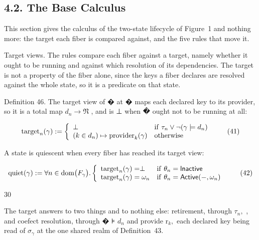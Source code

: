 \documentclass[
  10
]{article}
\begin{document}
\subsection{4.2. The Base Calculus}\label{the-base-calculus}

This section gives the calculus of the two-state lifecycle of Figure~1
and nothing more: the target each fiber is compared against, and the
five rules that move it.

Target views. The rules compare each fiber against a target, namely
whether it ought to be running and against which resolution of its
dependencies. The target is not a property of the fiber alone, since the
keys a fiber declares are resolved against the whole state, so it is a
predicate on that state.

Definition 46. The target view of � at � maps each declared key to its
provider, so it is a total map \(d _ { n } \to \mathfrak { N }\) , and
is ⊥ when � ought not to be running at all:

\[
\mathrm { t a r g e t } _ { n } ( \gamma ) : = \left\{ \begin{array} { l l } { \hfill \perp } & { \mathrm { i f } \ \tau _ { n } \vee \neg ( \gamma \models d _ { n } ) } \\ { \hfill ( k \in d _ { n } ) \mapsto \mathrm { p r o v i d e r } _ { k } ( \gamma ) } & { \mathrm { o t h e r w i s e } } \end{array} \right.\tag{41}
\]

A state is quiescent when every fiber has reached its target view:

\[
\operatorname { q u i e t } ( \gamma ) : = \forall n \in \operatorname { d o m } \bigl ( F _ { \gamma } \bigr ) . \left\{ \begin{array} { l l } { \operatorname { t a r g e t } _ { n } ( \gamma ) = \perp } & { \mathrm { i f ~ } \theta _ { n } = \mathsf { l n a c t i v e } } \\ { \operatorname { t a r g e t } _ { n } ( \gamma ) = \omega _ { n } } & { \mathrm { i f ~ } \theta _ { n } = \mathsf { A c t i v e } ( - , \omega _ { n } ) } \end{array} \right.\tag{42}
\]

30

The target answers to two things and to nothing else: retirement,
through \(\tau _ { n } ,\) , and coefect resolution, through � ⊧
\(d _ { n }\) and provide \(\mathrm { r } _ { k } ,\) each declared key
being read of \(\sigma _ { \gamma }\) at the one shared realm of
Definition~43.
\end{document}
